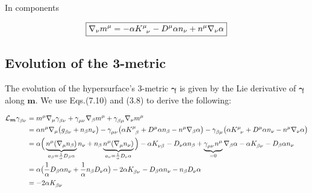\documentclass[12pt]{article}
\renewcommand{\vec}[1]{\bm{#1}}
\numberwithin{equation}{section}
\numberwithin{theorem}{subsection}
\begin{document}
In components

\begin{equation*}

   \boxed{\nabla_{\nu}m^{\mu} = -\alpha\tensor{K}{^\mu_\nu} - D^{\mu}\alpha n_{\nu} + n^{\mu}\nabla_{\nu}\alpha}

\end{equation*}

\subsection{Evolution of the 3-metric}

The evolution of the hypersurface's 3-metric $\vec{\gamma}$ is given by the Lie derivative of $\vec{\gamma}$ along $\vec{m}$. We use Eqs.(7.10) and (3.8) to derive the following:

\begin{align*}

    \mathcal{L}_{\vec{m}} \tensor{\gamma}{_\beta_\nu} &= m^{\mu}\nabla_{\mu}\tensor{\gamma}{_\beta_\nu}+\tensor{\gamma}{_\mu_\nu}\nabla_{\beta}m^{\mu} + \tensor{\gamma}{_\beta_\mu}\nabla_{\nu}m^{\mu} \\

    &= \alpha n^{\mu} \nabla_{\mu} \big(\tensor{g}{_\beta_\nu} + n_{\beta}n_{\nu} \big) - \tensor{\gamma}{_\mu_\nu} \big( \alpha \tensor{K}{^\mu_\beta} + D^{\mu}\alpha n_{\beta} - n^{\mu} \nabla_{\beta}\alpha \big) -\tensor{\gamma}{_\beta_\mu} \big(\alpha\tensor{K}{^\mu_\nu} + D^{\mu}\alpha n_{\nu} -n^{\mu}\nabla_{\nu}\alpha \big) \\

    &= \alpha \Big(\underbrace{n^{\mu}(\nabla_{\mu}n_{\beta})}_{a_{\beta} = \frac{1}{\alpha} D_{\beta}\alpha}n_{\nu} + n_{\beta}\underbrace{n^{\mu}(\nabla_{\mu}n_{\nu})}_{a_{\nu} = \frac{1}{\alpha}D_{\nu}\alpha} \Big) -\alpha\tensor{K}{_\nu_\beta} - D_{\nu}\alpha n_{\beta} + \underbrace{\tensor{\gamma}{_\mu_\nu}n^{\mu}}_{= 0}\nabla_{\beta}\alpha -\alpha\tensor{K}{_\beta_\nu} - D_{\beta}\alpha n_{\nu} \\

    &= \alpha \big(\frac{1}{\alpha} D_{\beta}\alpha n_{\nu} + \frac{1}{\alpha} n_{\beta} D_{\nu} \alpha \big) - 2\alpha\tensor{K}{_\beta_\nu} - D_{\beta}\alpha n_{\nu} -  n_{\beta} D_{\nu} \alpha \\

    &= -2\alpha\tensor{K}{_\beta_\nu}

\end{align*}
\end{document}
